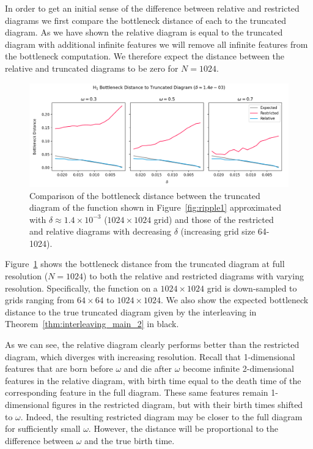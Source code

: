In order to get an initial sense of the difference between relative and restricted diagrams we first compare the bottleneck distance of each to the truncated diagram.
As we have shown the relative diagram is equal to the truncated diagram with additional infinite features we will remove all infinite features from the bottleneck computation.
We therefore expect the distance between the relative and truncated diagrams to be zero for $N=1024$.

\begin{figure}[htbp]\label{fig:bottleneck}
  \centering
  \includegraphics[width=\textwidth]{scripts/figures/matching2/bottleneck_delta.png}
  \caption{Comparison of the bottleneck distance between the truncated diagram of the function shown in Figure~\ref{fig:ripple1} approximated with $\delta\approx 1.4\times10^{-3}$ ($1024\times 1024$ grid) and those of the restricted and relative diagrams with decreasing $\delta$ (increasing grid size 64-1024).}
\end{figure}

Figure~\ref{fig:bottleneck} shows the bottleneck distance from the truncated diagram at full resolution ($N = 1024$) to both the relative and restricted diagrams with varying resolution.
Specifically, the function on a $1024\times 1024$ grid is down-sampled to grids ranging from $64\times 64$ to $1024\times 1024$.
We also show the expected bottleneck distance to the true truncated diagram given by the interleaving in Theorem~\ref{thm:interleaving_main_2} in black.

As we can see, the relative diagram clearly performs better than the restricted diagram, which diverges with increasing resolution.
Recall that 1-dimensional features that are born before $\omega$ and die after $\omega$ become infinite 2-dimensional features in the relative diagram, with birth time equal to the death time of the corresponding feature in the full diagram.
These same features remain 1-dimensional figures in the restricted diagram, but with their birth times shifted to $\omega$.
Indeed, the resulting restricted diagram may be closer to the full diagram for sufficiently small $\omega$.
However, the distance will be proportional to the difference between $\omega$ and the true birth time.

